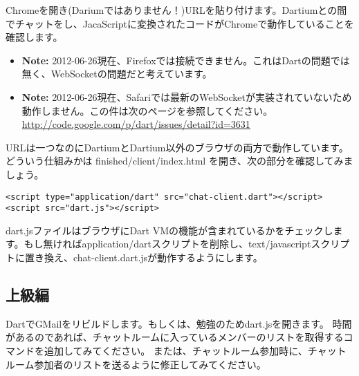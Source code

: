 
Chromeを開き(Dariumではありません！)URLを貼り付けます。Dartiumとの間でチャットをし、JacaScriptに変換されたコードがChromeで動作していることを確認します。


\begin{itemize}
\item {\bf Note:} 2012-06-26現在、Firefoxでは接続できません。これはDartの問題では無く、WebSocketの問題だと考えています。
\item {\bf Note:} 2012-06-26現在、Safariでは最新のWebSocketが実装されていないため動作しません。この件は次のページを参照してください。 \url{http://code.google.com/p/dart/issues/detail?id=3631}
\end{itemize}

URLは一つなのにDartiumとDartium以外のブラウザの両方で動作しています。どういう仕組みかは finished/client/index.html を開き、次の部分を確認してみましょう。

\begin{verbatim}
<script type="application/dart" src="chat-client.dart"></script>
<script src="dart.js"></script>
\end{verbatim}

dart.jsファイルはブラウザにDart VMの機能が含まれているかをチェックします。もし無ければapplication/dartスクリプトを削除し、text/javascriptスクリプトに置き換え、chat-client.dart.jsが動作するようにします。

\subsection{上級編}

DartでGMailをリビルドします。もしくは、勉強のためdart.jsを開きます。
時間があるのであれば、チャットルームに入っているメンバーのリストを取得するコマンドを追加してみてください。
または、チャットルーム参加時に、チャットルーム参加者のリストを送るように修正してみてください。

\clearpage
